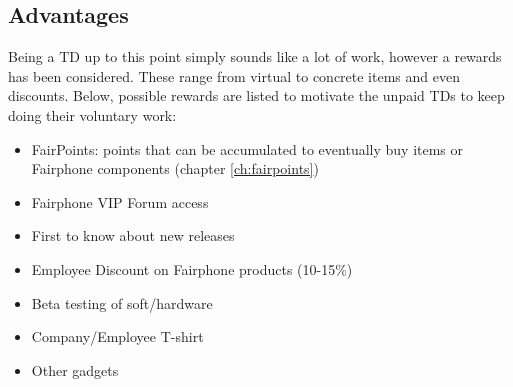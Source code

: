 \documentclass[final,a4paper]{report} %
\begin{document}
	\subsection{Advantages}
	\label{sec:td-regulations-advantages}
	Being a TD up to this point simply sounds like a lot of work, however a rewards has been considered. These range from virtual to concrete items and even discounts. Below, possible rewards are listed to motivate the unpaid TDs to keep doing their voluntary work:
	
	\begin{itemize}
		\item FairPoints: points that can be accumulated to eventually buy items or Fairphone components (chapter \ref{ch:fairpoints})
		\item Fairphone VIP Forum access
		\item First to know about new releases
		\item Employee Discount on Fairphone products (10-15\%)
		\item Beta testing of soft/hardware
		\item Company/Employee T-shirt
		\item Other gadgets
	\end{itemize}
\end{document}
